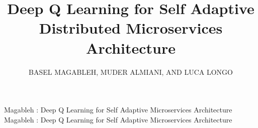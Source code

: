 \documentclass{ieeeaccess}
\begin{document}

\title{Deep Q Learning for Self Adaptive Distributed Microservices Architecture}
\author{\uppercase{Basel Magableh}, 
\uppercase{Muder Almiani, and Luca Longo}}
\address[1]{Technological University, Dublin, Ireland (e-mail: basel.magableh@dit.ie)}
\address[2]{Al-Hussein Bin Tala University, Ma'an, Jordan (e-mail: malmiani@my.bridgeport.edu)}
\address[3]{Technological University, Dublin, Ireland (e-mail: luca.longo@dit.ie)}
\tfootnote{}

\markboth
{Magableh \headeretal: Deep Q Learning for Self Adaptive Microservices Architecture  }
{Magableh \headeretal: Deep Q Learning for Self Adaptive Microservices Architecture}

\end{document}
